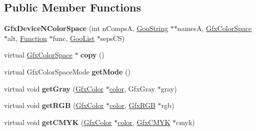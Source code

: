 \subsection*{Public Member Functions}
\begin{DoxyCompactItemize}
\item 
\mbox{\label{class_gfx_device_n_color_space_abe0364b0b6b97fdd22552c6bdde5e1ad}} 
{\bfseries Gfx\+Device\+N\+Color\+Space} (int n\+CompsA, \hyperlink{class_goo_string}{Goo\+String} $\ast$$\ast$namesA, \hyperlink{class_gfx_color_space}{Gfx\+Color\+Space} $\ast$alt, \hyperlink{class_function}{Function} $\ast$func, \hyperlink{class_goo_list}{Goo\+List} $\ast$seps\+CS)
\item 
\mbox{\label{class_gfx_device_n_color_space_af8ff35e2da17e50a2c1b5a005894a514}} 
virtual \hyperlink{class_gfx_color_space}{Gfx\+Color\+Space} $\ast$ {\bfseries copy} ()
\item 
\mbox{\label{class_gfx_device_n_color_space_a89da42ed65b889016d92494c111dea12}} 
virtual Gfx\+Color\+Space\+Mode {\bfseries get\+Mode} ()
\item 
\mbox{\label{class_gfx_device_n_color_space_aaa10ad7da921aeb21b41150487135eef}} 
virtual void {\bfseries get\+Gray} (\hyperlink{struct_gfx_color}{Gfx\+Color} $\ast$\hyperlink{structcolor}{color}, Gfx\+Gray $\ast$gray)
\item 
\mbox{\label{class_gfx_device_n_color_space_a5ddd22ce1e97a73e47734d7c73c94bc2}} 
virtual void {\bfseries get\+R\+GB} (\hyperlink{struct_gfx_color}{Gfx\+Color} $\ast$\hyperlink{structcolor}{color}, \hyperlink{struct_gfx_r_g_b}{Gfx\+R\+GB} $\ast$rgb)
\item 
\mbox{\label{class_gfx_device_n_color_space_ad5d90338e4daf2c0bd148607b248555d}} 
virtual void {\bfseries get\+C\+M\+YK} (\hyperlink{struct_gfx_color}{Gfx\+Color} $\ast$\hyperlink{structcolor}{color}, \hyperlink{struct_gfx_c_m_y_k}{Gfx\+C\+M\+YK} $\ast$cmyk)
\item 
\mbox{\label{class_gfx_device_n_color_space_a2fd6659d41db710a32772df08d7383e8}} 
$$
\end{DoxyCompactItemize}
